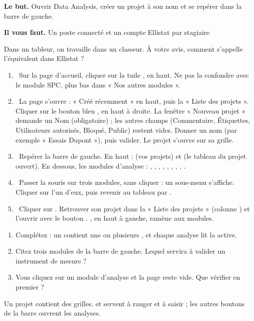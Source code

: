 \documentclass[10pt,a4paper]{article}
\begin{document}
\thispagestyle{fancy}
\begin{tcolorbox}[boite]\textbf{Le but.} Ouvrir Data Analysis, créer un projet à son nom et se repérer dans la barre de gauche.\par\textbf{Il vous faut.} Un poste connecté et un compte Ellistat par stagiaire\end{tcolorbox}
\begin{tcolorbox}[pred]Dans un tableur, on travaille dans un classeur. À votre avis, comment s'appelle l'équivalent dans Ellistat ?\reponse\end{tcolorbox}
\begin{enumerate}[label=\textcolor{cyan}{\textbf{\arabic*.}},leftmargin=15pt,itemsep=1.5pt]
\item \tagE\ Sur la page d'accueil, cliquer sur la tuile , en haut. Ne pas la confondre avec le module SPC, plus bas dans « Nos autres modules ».
\item \tagE\ La page  s'ouvre : « Créé récemment » en haut, puis la « Liste des projets ». Cliquer sur le bouton bleu , en haut à droite. La fenêtre « Nouveau projet » demande un Nom (obligatoire) ; les autres champs (Commentaire, Étiquettes, Utilisateurs autorisés, Bloqué, Public) restent vides. Donner un nom (par exemple « Essais Dupont »), puis valider. Le projet s'ouvre sur sa grille.
\item \tagE\ Repérer la barre de gauche. En haut :  (vos projets) et  (le tableau du projet ouvert). En dessous, les modules d'analyse : , , , , , , , , .
\item \tagE\ Passer la souris sur trois modules, sans cliquer : un sous-menu s'affiche. Cliquer sur l'un d'eux, puis revenir au tableau par .
\item \tagE\ Cliquer sur . Retrouver son projet dans la « Liste des projets » (colonne ) et l'ouvrir avec le bouton . , en haut à gauche, ramène aux modules.
\end{enumerate}
\begin{enumerate}[label=\textcolor{cyan}{\textbf{Q\arabic*.}},leftmargin=22pt]
\item Complétez : un \champ{22mm} contient une ou plusieurs \champ{22mm}, et chaque analyse lit la \champ{22mm} active.\par\vspace{5pt}
\item Citez trois modules de la barre de gauche. Lequel servira à valider un instrument de mesure ?\reponse[2]
\item Vous cliquez sur un module d'analyse et la page reste vide. Que vérifier en premier ?\reponse[1]
\end{enumerate}
\begin{tcolorbox}[retenir]Un projet contient des grilles.  et  servent à ranger et à saisir ; les autres boutons de la barre ouvrent les analyses.\end{tcolorbox}
\end{document}
